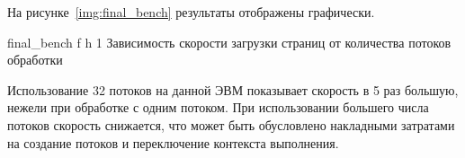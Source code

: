 \clearpage

На рисунке~\ref{img:final_bench} результаты отображены графически.

{final_bench}
{f}
{h}
{1 \textwidth}
{Зависимость скорости загрузки страниц от количества потоков обработки}

Использование 32 потоков на данной ЭВМ показывает скорость в 5 раз большую, нежели при обработке с одним потоком. При использовании большего числа потоков скорость снижается, что может быть обусловлено накладными затратами на создание потоков и переключение контекста выполнения.